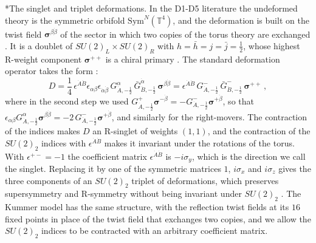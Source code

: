 \documentclass[aps,onecolumn,groupedaddress,nofootinbib,pra]{revtex4-2}
\makeatletter
\renewcommand\paragraph{\@startsection{paragraph}{4}{\parindent}{\z@}{-1em}{\normalfont\normalsize\bfseries}}
\newcommand{\Sym}{\mathrm{Sym}}
\newcommand{\Tf}{\mathbb T^4}
\newcommand{\twist}{{\boldsymbol\sigma}}
\makeatother
\begin{document}
\paragraph*{The singlet and triplet deformations.}
In the D1-D5 literature the undeformed theory is the symmetric orbifold $\Sym^N(\Tf)$, and the deformation is built on the twist field $\twist^{\beta\dot\beta}$ of the sector in which two copies of the torus theory are exchanged \cite{Avery:2010er,Guo:2019ady}. It is a doublet of $SU(2)_L\times SU(2)_R$ with $h=\bar h=j=\bar j=\frac12$, whose highest R-weight component $\twist^{++}$ is a chiral primary \cite{Avery:2010er}. The standard deformation operator takes the form \cite{Guo:2019ady}:
\begin{equation}
\label{eq:Dstandard}
D=\frac14\,\epsilon^{\dot A\dot B}\epsilon_{\alpha\beta}\epsilon_{\dot\alpha\dot\beta}\,G^{\alpha}_{\dot A,-\frac12}\,
\bar G^{\dot\alpha}_{\dot B,-\frac12}\,\twist^{\beta\dot\beta}
=\epsilon^{\dot A\dot B}\,G^{-}_{\dot A,-\frac12}\,\bar G^{-}_{\dot B,-\frac12}\,\twist^{++}\,,
\end{equation}
where in the second step we used $G^{+}_{\dot A,-\frac12}\twist^{-\dot\beta}=-G^{-}_{\dot A,-\frac12}\twist^{+\dot\beta}$, so that $\epsilon_{\alpha\beta}G^\alpha_{\dot A,-\frac12}\twist^{\beta\dot\beta}=-2\,G^{-}_{\dot A,-\frac12}\twist^{+\dot\beta}$, and similarly for the right-movers. The contraction of the indices makes $D$ an R-singlet of weights $(1,1)$, and the contraction of the $SU(2)_2$ indices with $\epsilon^{\dot A\dot B}$ makes it invariant under the rotations of the torus. With $\epsilon^{+-}=-1$ the coefficient matrix $\epsilon^{\dot A\dot B}$ is $- i \sigma_y$, which is the direction we call the singlet. Replacing it by one of the symmetric matrices $1$, $ i \sigma_x$ and $ i \sigma_z$ gives the three components of an $SU(2)_2$ triplet of deformations, which preserves supersymmetry and R-symmetry without being invariant under $SU(2)_2$ \cite{Gaberdiel:2025smz}. The Kummer model has the same structure, with the reflection twist fields at its $16$ fixed points in place of the twist field that exchanges two copies, and we allow the $SU(2)_2$ indices to be contracted with an arbitrary coefficient matrix.\\
\end{document}
